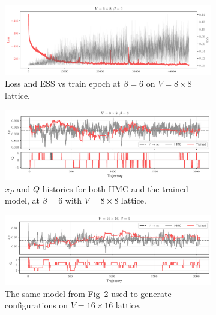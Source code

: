 \documentclass[a4paper,11pt]{article}
\begin{document}
\begin{figure}[htpb]
    \centering
    \begin{subfigure}[b]{\textwidth}
        \includegraphics[width=\textwidth]{assets/ess_loss_dkl_train.pdf}
        \caption{\label{subfig:loss}Loss and ESS vs train epoch at \(\beta =
        6\) on \(V = 8\times 8\) lattice.}
    \end{subfigure}
    \begin{subfigure}[b]{\textwidth}
        \includegraphics[width=\textwidth]{assets/histories_8x8_beta6.pdf}
        \caption{\label{subfig:q8}\(x_{P}\) and \(Q\) histories for both HMC
            and the trained model, at \(\beta = 6\) with \(V = 8 \times 8\)
        lattice.}
    \end{subfigure}
    \hfill
    \begin{subfigure}[b]{\textwidth}
        \includegraphics[width=\textwidth]{assets/histories_16x16_beta6_xfr.pdf}
        \caption{\label{subfig:q16}The same model from Fig~\ref{subfig:q8} used
        to generate configurations on \(V = 16\times16\) lattice.}
    \end{subfigure}
    \caption{\label{fig:histories}}
\end{figure}
%
\end{document}
